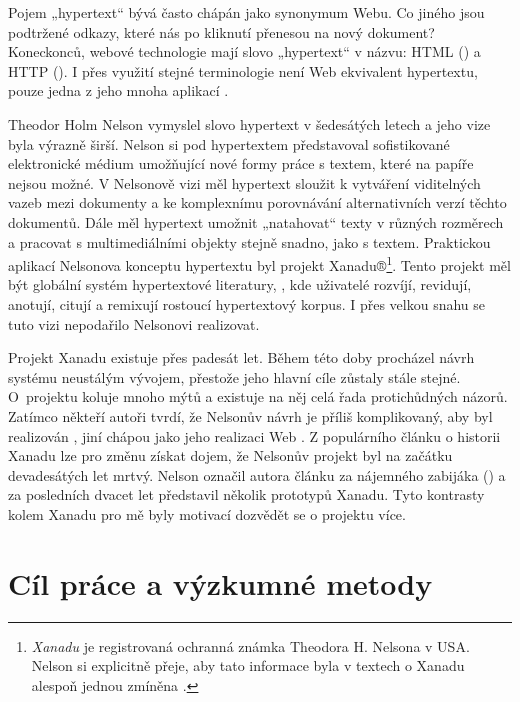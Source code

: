 Pojem „hypertext“ bývá často chápán jako synonymum Webu. Co jiného jsou podtržené odkazy, které nás po kliknutí přenesou na nový dokument? Koneckonců, webové technologie mají slovo „hypertext“ v názvu: HTML () a HTTP (). I přes využití stejné terminologie není Web ekvivalent hypertextu, pouze jedna z jeho mnoha aplikací \autocite[xx]{Barnet2014}.

Theodor Holm Nelson vymyslel slovo hypertext v šedesátých letech a jeho vize byla výrazně širší. Nelson si pod hypertextem představoval sofistikované elektronické médium umožňující nové formy práce s textem, které na papíře nejsou možné. V Nelsonově vizi měl hypertext sloužit k vytváření viditelných vazeb mezi dokumenty a ke komplexnímu porovnávání alternativních verzí těchto dokumentů. Dále měl hypertext umožnit „natahovat“ texty v různých rozměrech a pracovat s multimediálními objekty stejně snadno, jako s textem.
Praktickou aplikací Nelsonova konceptu hypertextu byl projekt Xanadu®\footnote{\emph{Xanadu} je registrovaná ochranná známka Theodora H. Nelsona v USA. Nelson si explicitně přeje, aby tato informace byla v textech o Xanadu alespoň jednou zmíněna \autocite{TN:TBL}.}. Tento projekt měl být globální systém hypertextové literatury, , kde uživatelé rozvíjí, revidují, anotují, citují a remixují rostoucí hypertextový korpus. 
I přes velkou snahu se tuto vizi nepodařilo Nelsonovi realizovat.

Projekt Xanadu existuje přes padesát let. Během této doby procházel návrh systému neustálým vývojem, přestože jeho hlavní cíle zůstaly stále stejné. O~projektu koluje mnoho mýtů a existuje na něj celá řada protichůdných názorů. Zatímco někteří autoři tvrdí, že Nelsonův návrh je příliš komplikovaný, aby byl realizován \autocite[17]{McConaghy2015}, jiní chápou jako jeho realizaci Web \autocite{wikisofia:TedNelson}.
Z populárního článku o historii Xanadu  \autocite{Wolf1995} lze pro změnu získat dojem, že Nelsonův projekt byl na začátku devadesátých let mrtvý. Nelson označil autora článku za nájemného zabijáka () a za posledních dvacet let představil několik prototypů Xanadu. Tyto kontrasty kolem Xanadu pro mě byly motivací dozvědět se o projektu více.

\section{Cíl práce a výzkumné metody}


